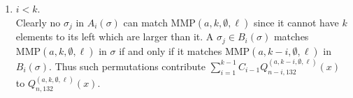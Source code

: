 \documentclass[
final,nomarks
]{dmtcs-episciences}
\newcommand{\Qmmn}[2]{Q_{#2,132}^{(#1)}(x)}
\newcommand{\MMP}{\mathrm{MMP}}
\begin{document}
\begin{enumerate}[{\bf Case }\bf 1.]
	\item \begin{math}i < k\end{math}. \\
	Clearly no \begin{math}\sigma_j\end{math} in \begin{math}A_i(\sigma) \end{math} can match \begin{math}\MMP(a,k,\emptyset,\ell)\end{math} since it cannot 
	have \begin{math}k\end{math} elements to its left which are larger than it. A \begin{math}\sigma_j \in B_i(\sigma)\end{math} 
	matches  \begin{math}\MMP(a,k,\emptyset,\ell)\end{math} in \begin{math}\sigma\end{math} if and only if it matches 
	\begin{math}\MMP(a,k-i,\emptyset,\ell)\end{math} in \begin{math}B_i(\sigma)\end{math}.  Thus such 
	permutations contribute \begin{math}\sum_{i=1}^{k-1}C_{i-1}\Qmmn{a,k-i,\emptyset,\ell}{n-i}\end{math} to 
	\begin{math}\Qmmn{a,k,\emptyset,\ell}{n}\end{math}.
	

\end{enumerate}
\end{document}
